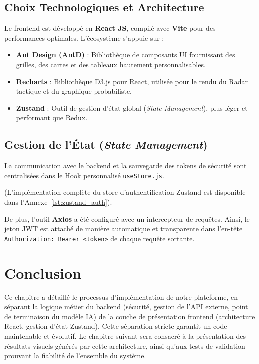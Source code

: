\subsection{Choix Technologiques et Architecture}
Le frontend est développé en \textbf{React JS}, compilé avec \textbf{Vite} pour des performances optimales. L'écosystème s'appuie sur :
\begin{itemize}
    \item \textbf{Ant Design (AntD)} : Bibliothèque de composants UI fournissant des grilles, des cartes et des tableaux hautement personnalisables.
    \item \textbf{Recharts} : Bibliothèque D3.js pour React, utilisée pour le rendu du Radar tactique et du graphique probabiliste.
    \item \textbf{Zustand} : Outil de gestion d'état global (\textit{State Management}), plus léger et performant que Redux.
\end{itemize}

\subsection{Gestion de l'État (\textit{State Management})}
La communication avec le backend et la sauvegarde des tokens de sécurité sont centralisées dans le Hook personnalisé \texttt{useStore.js}.

(L'implémentation complète du store d'authentification Zustand est disponible dans l'Annexe~\ref{lst:zustand_auth}).

De plus, l'outil \textbf{Axios} a été configuré avec un intercepteur de requêtes. Ainsi, le jeton JWT est attaché de manière automatique et transparente dans l'en-tête \texttt{Authorization: Bearer <token>} de chaque requête sortante.

\section*{Conclusion}
Ce chapitre a détaillé le processus d'implémentation de notre plateforme, en séparant la logique métier du backend (sécurité, gestion de l'API externe, point de terminaison du modèle IA) de la couche de présentation frontend (architecture React, gestion d'état Zustand). Cette séparation stricte garantit un code maintenable et évolutif. Le chapitre suivant sera consacré à la présentation des résultats visuels générés par cette architecture, ainsi qu'aux tests de validation prouvant la fiabilité de l'ensemble du système.
